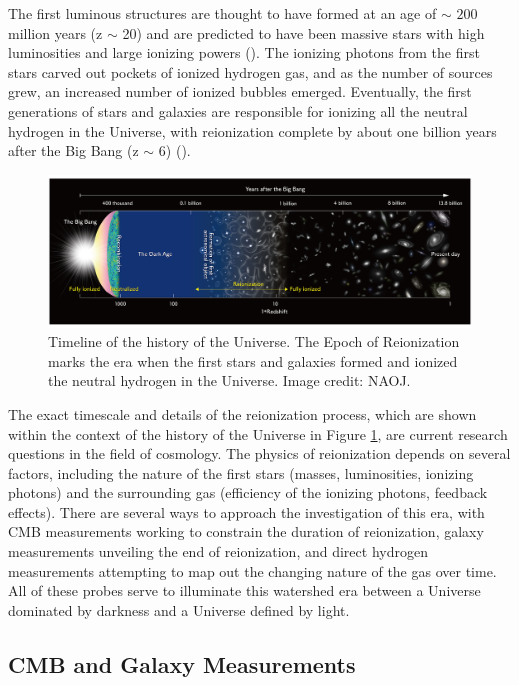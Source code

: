 The first luminous structures are thought to have formed at an age of $\sim$ $200$ million years (z $\sim$ 20) and are predicted to have been massive stars with high luminosities and large ionizing powers (\citealt{loeb_furlanetto_2013}). The ionizing photons from the first stars carved out pockets of ionized hydrogen gas, and as the number of sources grew, an increased number of ionized bubbles emerged. Eventually, the first generations of stars and galaxies are responsible for ionizing all the neutral hydrogen in the Universe, with reionization complete by about one billion years after the Big Bang (z $\sim$ 6) (\citealt{furlanetto_et_al2006}). 

\begin{figure}
	\centering
	\includegraphics[width=\columnwidth]{plots/timeline_history.jpg}
	\caption{Timeline of the history of the Universe. The Epoch of Reionization marks the era when the first stars and galaxies formed and ionized the neutral hydrogen in the Universe. Image credit: NAOJ.}
	\label{fig:timeline_history}
\end{figure}

The exact timescale and details of the reionization process, which are shown within the context of the history of the Universe in Figure \ref{fig:timeline_history}, are current research questions in the field of cosmology. The physics of reionization depends on several factors, including the nature of the first stars (masses, luminosities, ionizing photons) and the surrounding gas (efficiency of the ionizing photons, feedback effects). There are several ways to approach the investigation of this era, with CMB measurements working to constrain the duration of reionization, galaxy measurements unveiling the end of reionization, and direct hydrogen measurements attempting to map out the changing nature of the gas over time. All of these probes serve to illuminate this watershed era between a Universe dominated by darkness and a Universe defined by light.

\subsection{CMB and Galaxy Measurements}

